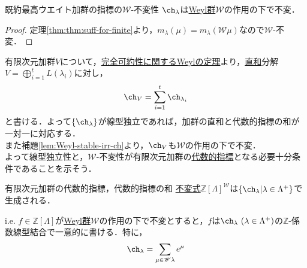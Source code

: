 \documentclass[rep_main]{subfiles}
\begin{document}
\begin{mylem}[label=lem:Weyl-stable-irr-ch]{既約最高ウエイト加群の指標の$\mathscr{W}$-不変性}
	$\ch_\lambda$は\hyperref[def:Weylgroup]{Weyl群}$\mathscr{W}$の作用の下で不変．
\end{mylem}
\begin{proof}
	定理\ref{thm:thm:suff-for-finite}より，$m_\lambda(\mu) = m_\lambda(\mathscr{W}\mu)$なので$\mathscr{W}$-不変．
\end{proof}
有限次元加群$V$について，\hyperref[thm:Weyl]{完全可約性に関するWeylの定理}より，\hyperref[def:gmod-directsum]{直和}分解$V = \bigoplus_{i=1}^t L(\lambda_i)$に対し，
\begin{equation}
	\ch_V = \sum_{i=1}^t \ch_{\lambda_i}
\end{equation}
と書ける．よって$\{\ch_{\lambda}\}$が線型独立であれば，加群の直和と代数的指標の和が一対一に対応する．\\
また補題\ref{lem:Weyl-stable-irr-ch}より，$\ch_V$も$\mathscr{W}$の作用の下で不変．\\
よって線型独立性と，$\mathscr{W}$-不変性が有限次元加群の\hyperref[def:alg-character]{代数的指標}となる必要十分条件であることを示そう．
\begin{myprop}[label=prop:alg-character-finite]{有限次元加群の代数的指標，代数的指標の和}
	\hyperref[def:invariant-polynomial]{不変式}$\mathbb{Z}[\Lambda]^{\mathscr{W}}$は$\{\ch_\lambda | \lambda \in \Lambda^+ \}$で生成される．
	
	i.e. $f \in \mathbb{Z}[\Lambda]$が\hyperref[def:Weylgroup]{Weyl群}$\mathscr{W}$の作用の下で不変とすると，$f$は$\ch_\lambda\ (\lambda \in \Lambda^+)$の$\mathbb{Z}$-係数線型結合で一意的に書ける．特に，
	\begin{equation}
		\ch_\lambda = \sum_{\mu \in \mathscr{W}\lambda} e^\mu
	\end{equation}
\end{myprop}
\end{document}
